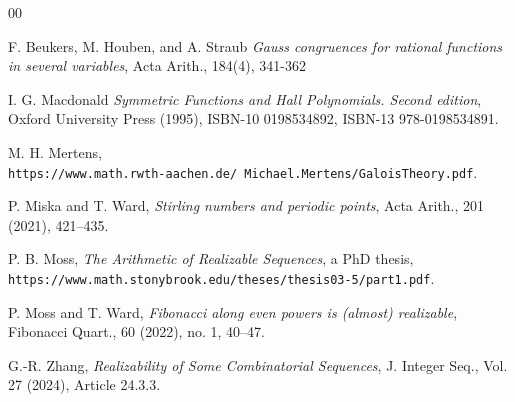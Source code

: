 \documentclass[preprint,12pt]{elsarticle}
\begin{document}
\begin{thebibliography}{00}



    F. Beukers, M. Houben, and A. Straub \emph{Gauss congruences for rational functions in several variables}, Acta Arith., 184(4), 341-362

    I. G. Macdonald \emph{Symmetric Functions and Hall Polynomials. Second edition}, Oxford University Press (1995), ISBN-10 0198534892, ISBN-13 978-0198534891.

    M. H. Mertens, \\ \texttt{https://www.math.rwth-aachen.de/~Michael.Mertens/GaloisTheory.pdf}.

    P. Miska and T. Ward, \emph{Stirling numbers and periodic points}, Acta Arith., 201 (2021), 421--435.

    P. B. Moss, \emph{ The Arithmetic of Realizable Sequences}, 
    a PhD thesis, \texttt{https://www.math.stonybrook.edu/theses/thesis03-5/part1.pdf}.
   
    P. Moss and T. Ward, \emph{Fibonacci along even powers is (almost) realizable}, Fibonacci Quart., 60 (2022), no. 1, 40--47.

    G.-R. Zhang, \emph{Realizability of Some Combinatorial Sequences}, J. Integer Seq., Vol. 27 (2024), Article 24.3.3.

   \end{thebibliography}
\end{document}
